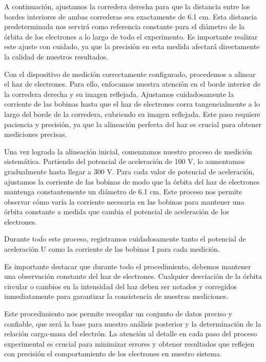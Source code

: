 \documentclass[twocolumn,a4paper,11pt]{scrartcl}
\begin{document}
A continuación, ajustamos la corredera derecha para que la distancia entre los bordes interiores de ambas correderas sea exactamente de 6.1 cm. Esta distancia predeterminada nos servirá como referencia constante para el diámetro de la órbita de los electrones a lo largo de todo el experimento. Es importante realizar este ajuste con cuidado, ya que la precisión en esta medida afectará directamente la calidad de nuestros resultados.

Con el dispositivo de medición correctamente configurado, procedemos a alinear el haz de electrones. Para ello, enfocamos nuestra atención en el borde interior de la corredera derecha y su imagen reflejada. Ajustamos cuidadosamente la corriente de las bobinas hasta que el haz de electrones corra tangencialmente a lo largo del borde de la corredera, cubriendo su imagen reflejada. Este paso requiere paciencia y precisión, ya que la alineación perfecta del haz es crucial para obtener mediciones precisas.

Una vez lograda la alineación inicial, comenzamos nuestro proceso de medición sistemática. Partiendo del potencial de aceleración de 100 V, lo aumentamos gradualmente  hasta llegar a 300 V. Para cada valor de potencial de aceleración, ajustamos la corriente de las bobinas de modo que la órbita del haz de electrones mantenga constantemente un diámetro de 6.1 cm. Este proceso nos permite observar cómo varía la corriente necesaria en las bobinas para mantener una órbita constante a medida que cambia el potencial de aceleración de los electrones.

Durante todo este proceso, registramos cuidadosamente tanto el potencial de aceleración U como la corriente de las bobinas I para cada medición.

Es importante destacar que durante todo el procedimiento, debemos mantener una observación constante del haz de electrones. Cualquier desviación de la órbita circular o cambios en la intensidad del haz deben ser notados y corregidos inmediatamente para garantizar la consistencia de nuestras mediciones.

Este procedimiento nos permite recopilar un conjunto de datos preciso y confiable, que será la base para nuestro análisis posterior y la determinación de la relación carga-masa del electrón. La atención al detalle en cada paso del proceso experimental es crucial para minimizar errores y obtener resultados que reflejen con precisión el comportamiento de los electrones en nuestro sistema.
\end{document}
